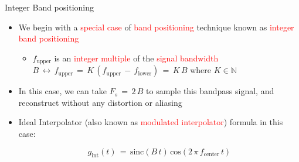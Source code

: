 \begin{frame}[t]{Integer Band positioning}

\begin{itemize}

\item We begin with a \textcolor{red}{special case} of \textcolor{red}{band positioning} technique known as \textcolor{red}{integer band positioning}

	\begin{itemize}
	\item $f_{\text{upper}}$ is an \textcolor{red}{integer multiple} of the \textcolor{red}{signal bandwidth} $B \, \leftrightarrow \, f_{\text{upper}} \, = \, K \, (f_{\text{upper}} \, - \, f_{\text{lower}}) \, = \, K \, B$ where $K \in \mathbb{N}$
	\end{itemize}


\item In this case, we can take $F_s \, = \, 2 \, B$ to sample this bandpass signal, and reconstruct without any distortion or aliasing

\item Ideal Interpolator (also known as \textcolor{red} {modulated interpolator}) formula in this case:

\begin{equation}
g_{\text{int}}(t) \, = \, \text{sinc}(B \, t) \, \text{cos}(2 \, \pi \, f_{\text{center}} \, t)
\end{equation}

\end{itemize}

\end{frame}


